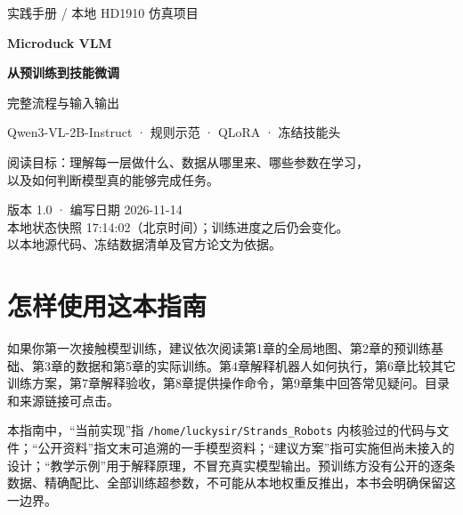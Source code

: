 \documentclass[UTF8,fontset=none,zihao=-4,oneside,openany]{ctexbook}
\begin{document}
\begin{titlepage}
\thispagestyle{empty}
\vspace*{12mm}
{\sffamily\color{accent}\large 实践手册 / 本地 HD1910 仿真项目\par}
\vspace{12mm}
{\sffamily\bfseries\color{ink}\fontsize{31}{42}\selectfont Microduck VLM\par}
\vspace{5mm}
{\sffamily\bfseries\color{ink}\fontsize{23}{34}\selectfont 从预训练到技能微调\par 完整流程与输入输出\par}
\vspace{12mm}
{\large Qwen3-VL-2B-Instruct · 规则示范 · QLoRA · 冻结技能头\par}
\vspace{12mm}
\vfill
{\large 阅读目标：理解每一层做什么、数据从哪里来、哪些参数在学习，\\
以及如何判断模型真的能够完成任务。\par}
\vspace{8mm}
{\small 版本 1.0 · 编写日期 2026-11-14\\
本地状态快照 17:14:02（北京时间）；训练进度之后仍会变化。\\
以本地源代码、冻结数据清单及官方论文为依据。}
\end{titlepage}
\frontmatter
\chapter*{怎样使用这本指南}
如果你第一次接触模型训练，建议依次阅读第1章的全局地图、第2章的预训练基础、第3章的数据和第5章的实际训练。第4章解释机器人如何执行，第6章比较其它训练方案，第7章解释验收，第8章提供操作命令，第9章集中回答常见疑问。目录和来源链接可点击。

本指南中，“当前实现”指 \texttt{/home/luckysir/Strands\_Robots} 内核验过的代码与文件；“公开资料”指文末可追溯的一手模型资料；“建议方案”指可实施但尚未接入的设计；“教学示例”用于解释原理，不冒充真实模型输出。预训练方没有公开的逐条数据、精确配比、全部训练超参数，不可能从本地权重反推出，本书会明确保留这一边界。
\end{document}
